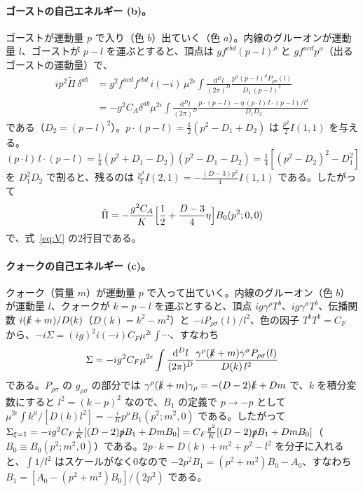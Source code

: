\documentclass[a4paper,10pt]{ltjsarticle}
\newcommand{\dd}{\mathrm{d}}
\begin{document}
\paragraph{ゴーストの自己エネルギー (b)。}ゴーストが運動量 $p$ で入り（色 $b$）出ていく（色 $a$）。内線のグルーオンが運動量 $l$、ゴーストが $p-l$ を運ぶとすると、頂点は $gf^{cbd}(p-l)^\rho$ と $gf^{acd}p^\sigma$（出るゴーストの運動量）で、
\begin{equation*}
\begin{aligned}
ip^2\tilde\Pi\,\delta^{ab}&=g^2f^{acd}f^{cbd}\,i(-i)\,\mu^{2\epsilon}\int\frac{\dd^Dl}{(2\pi)^D}\frac{p^\sigma(p-l)^\rho P_{\rho\sigma}(l)}{D_1\,(p-l)^2}\\
&=-g^2C_A\delta^{ab}\mu^{2\epsilon}\int\frac{\dd^Dl}{(2\pi)^D}\frac{p\cdot(p-l)-\eta\,(p\cdot l)\,l\cdot(p-l)/l^2}{D_1D_2}
\end{aligned}
\end{equation*}
である（$D_2=(p-l)^2$）。$p\cdot(p-l)=\frac12(p^2-D_1+D_2)$ は $\frac{p^2}2I(1,1)$ を与える。$(p\cdot l)\,l\cdot(p-l)=\frac14(p^2+D_1-D_2)(p^2-D_1-D_2)=\frac14[(p^2-D_2)^2-D_1^2]$ を $D_1^2D_2$ で割ると、残るのは $\frac{p^4}4I(2,1)=-\frac{(D-3)p^2}4I(1,1)$ である。したがって
\begin{equation*}
\tilde\Pi=-\frac{g^2C_A}{K}\Bigl[\frac12+\frac{D-3}4\eta\Bigr]B_0(p^2;0,0)
\end{equation*}
で、式~\eqref{eq:V} の2行目である。

\paragraph{クォークの自己エネルギー (c)。}クォーク（質量 $m$）が運動量 $p$ で入って出ていく。内線のグルーオン（色 $b$）が運動量 $l$、クォークが $k=p-l$ を運ぶとすると、頂点 $ig\gamma^\rho T^b$、$ig\gamma^\sigma T^b$、伝播関数 $i(\slashed k+m)/D(k)$（$D(k)=k^2-m^2$）と $-iP_{\rho\sigma}(l)/l^2$、色の因子 $T^bT^b=C_F$ から、$-i\Sigma=(ig)^2i(-i)C_F\mu^{2\epsilon}\int\cdots$、すなわち
\begin{equation*}
\Sigma=-ig^2C_F\mu^{2\epsilon}\int\frac{\dd^Dl}{(2\pi)^D}\frac{\gamma^\rho(\slashed k+m)\gamma^\sigma P_{\rho\sigma}(l)}{D(k)\,l^2}
\end{equation*}
である。$P_{\rho\sigma}$ の $g_{\rho\sigma}$ の部分では $\gamma^\rho(\slashed k+m)\gamma_\rho=-(D-2)\slashed k+Dm$ で、$k$ を積分変数にすると $l^2=(k-p)^2$ なので、$B_1$ の定義で $p\to-p$ として $\mu^{2\epsilon}\int k^\mu/[D(k)l^2]=-\frac iKp^\mu B_1(p^2;m^2,0)$ である。したがって $\Sigma_{\xi=1}=-ig^2C_F\frac iK[(D-2)\slashed pB_1+DmB_0]=C_F\frac{g^2}K[(D-2)\slashed pB_1+DmB_0]$（$B_0\equiv B_0(p^2;m^2,0)$）である。$2p\cdot k=D(k)+m^2+p^2-l^2$ を分子に入れると、$\int1/l^2$ はスケールがなく0なので $-2p^2B_1=(p^2+m^2)B_0-A_0$、すなわち $B_1=[A_0-(p^2+m^2)B_0]/(2p^2)$ である。
\end{document}
